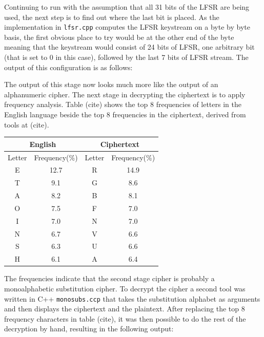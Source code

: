 \documentclass[pdflatex, a4paper,12pt]{article}
\begin{document}
Continuing to run with the assumption that all 31 bits of the LFSR are being
used, the next step is to find out where the last bit is placed. As the
implementation in \verb+lfsr.cpp+ computes the LFSR keystream on a byte by byte
basis, the first obvious place to try would be at the other end of the byte
meaning that the keystream would consist of 24 bits of LFSR, one arbitrary bit
(that is set to 0 in this case), followed by the last 7 bits of LFSR stream. The
output of this configuration is as follows:

\begin{quote}

\end{quote}

The output of this stage now looks much more like the output of an alphanumeric
cipher. The next stage in decrypting the ciphertext is to apply frequency
analysis. Table (cite) shows the top 8 frequencies of letters in the English
language beside the top 8 frequencies in the ciphertext, derived from tools at
(cite).
\begin{center}
\begin{tabular}{cc|cc}
    \multicolumn{2}{c|}{English} & \multicolumn{2}{c}{Ciphertext} \\
    \hline
    Letter & Frequency(\%) & Letter & Frequency(\%) \\
    \hline
    E                & 12.7         & R      & 14.9  \\
    T                & 9.1          & G      & 8.6   \\
    A                & 8.2          & B      & 8.1   \\
    O                & 7.5          & F      & 7.0   \\
    I                & 7.0          & N      & 7.0   \\
    N                & 6.7          & V      & 6.6   \\
    S                & 6.3          & U      & 6.6   \\
    H                & 6.1          & A      & 6.4   \\
\end{tabular}
\end{center}

The frequencies indicate that the second stage cipher is probably a
monoalphabetic substitution cipher. To decrypt the cipher a second tool was
written in C++ \verb+monosubs.ccp+ that takes the substitution alphabet as
arguments and then displays the ciphertext and the plaintext. After replacing
the top 8 frequency characters in table (cite), it was then possible to do the
rest of the decryption by hand, resulting in the following output:
\end{document}
